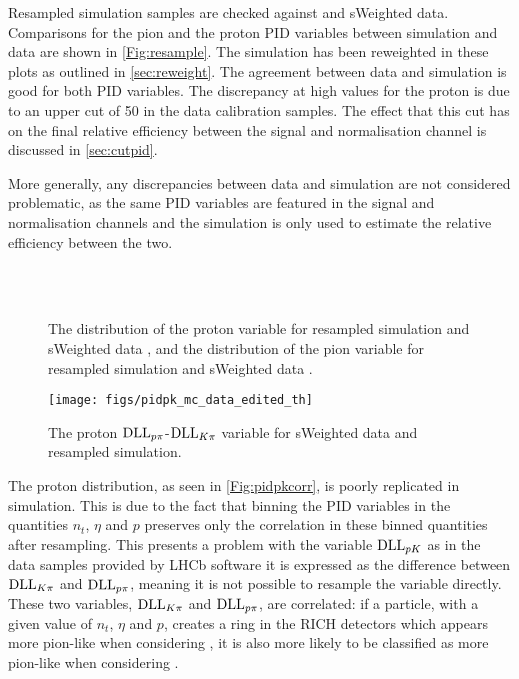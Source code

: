   Resampled simulation samples are checked against \LbKjpsi and \Lbpijpsi sWeighted data. Comparisons for the pion \dllkpi and the proton \dllppi PID variables between simulation and data are shown in \autoref{Fig:resample}. The simulation has been reweighted in these plots as outlined in \autoref{sec:reweight}. The agreement between data and simulation is good for both PID variables. The discrepancy at high values for the proton \dllppi is due to an upper cut of 50 in the data calibration samples. The effect that this cut has on the final relative efficiency between the signal and normalisation channel is discussed in \autoref{sec:cutpid}. %

More generally, any discrepancies between data and simulation are not considered problematic, as the same PID variables are featured in the signal and normalisation channels and the simulation is only used to estimate the relative efficiency between the two. %

  \begin{figure}[!ht]\def\nh{0.3\textwidth}
  \centering
    \\
      \\
  \caption{The distribution of the proton \dllppi variable for resampled \LbKjpsi simulation and \LbKjpsi sWeighted data \protect{}, and the distribution of the pion \dllkpi variable for resampled \Lbpijpsi simulation and \Lbpijpsi sWeighted data \protect{}.}
  \label{Fig:resample}
  \end{figure}



\begin{figure}[!t]\def\nh{0.3\textwidth}
           \centering   
       \texttt{[image: figs/pidpk\_mc\_data\_edited\_th]}   %
        \caption{The proton $\mathrm{DLL}_{{p}{\pi}}$-$\mathrm{DLL}_{{K}{\pi}}$  variable for \LbKjpsi sWeighted data and \LbKjpsi resampled simulation.}%
 \label{Fig:pidpkcorr}       
\end{figure}
The proton \dllpk distribution, as seen in \autoref{Fig:pidpkcorr}, is poorly replicated in simulation. This is due to the fact that binning the PID variables in the quantities $n_{t}$, $\eta$ and $p$ preserves only the correlation in these binned quantities after resampling. This presents a problem with the variable $\mathrm{DLL}_{{p}{K}}$ as in the data samples provided by LHCb software it is expressed as the difference between $\mathrm{DLL}_{{K}{\pi}}$ and $\mathrm{DLL}_{{p}{\pi}}$, meaning it is not possible to resample the variable \dllpk directly. These two variables, $\mathrm{DLL}_{{K}{\pi}}$ and $\mathrm{DLL}_{{p}{\pi}}$, are correlated: if a particle, with a given value of $n_{t}$, $\eta$ and $p$, creates a ring in the RICH detectors which appears more pion-like when considering \dllppi,  it is also more likely to be classified as more pion-like when considering \dllkpi.



